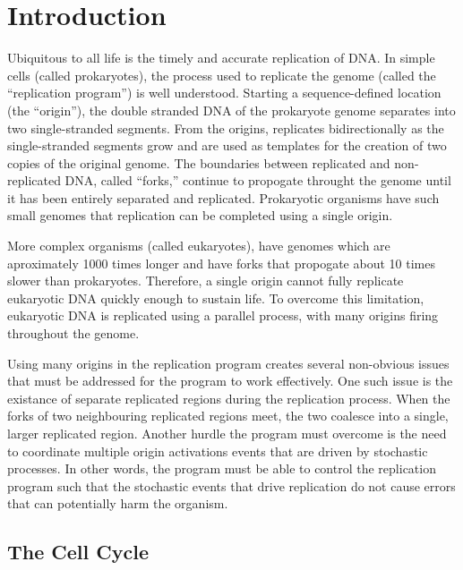 \chapter{Introduction}

Ubiquitous to all life is the timely and accurate replication of DNA.
In simple cells (called prokaryotes), the process used to replicate the genome (called the ``replication program'') is well understood.
Starting a sequence-defined location (the ``origin''), the double stranded DNA of the prokaryote genome separates into two single-stranded segments.
From the origins, replicates bidirectionally as the single-stranded segments grow and are used as templates for the creation of two copies of the original genome.
The boundaries between replicated and non-replicated DNA, called ``forks,'' continue to propogate throught the genome until it has been entirely separated and replicated.
Prokaryotic organisms have such small genomes that replication can be completed using a single origin.\cite{MolecularCellBiology}

More complex organisms (called eukaryotes), have genomes which are aproximately 1000 times longer and have forks that propogate about 10 times slower than prokaryotes.
Therefore, a single origin cannot fully replicate eukaryotic DNA quickly enough to sustain life.
To overcome this limitation, eukaryotic DNA is replicated using a parallel process, with many origins firing throughout the genome.

Using many origins in the replication program creates several non-obvious issues that must be addressed for the program to work effectively.
One such issue is the existance of separate replicated regions during the replication process.
When the forks of two neighbouring replicated regions meet, the two coalesce into a single, larger replicated region.
Another hurdle the program must overcome is the need to coordinate multiple origin activations events that are driven by stochastic processes.
In other words, the program must be able to control the replication program such that the stochastic events that drive replication do not cause errors that can potentially harm the organism.\cite{eukaryotereview}


	\section{The Cell Cycle}
	
